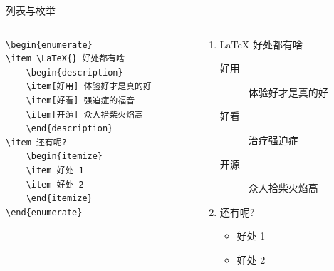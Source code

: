 \begin{frame}[fragile]{列表与枚举}
    \begin{columns}
        \begin{column}{.6\textwidth}
            \begin{lstlisting}[basicstyle=\ttfamily\small]
\begin{enumerate}
\item \LaTeX{} 好处都有啥
    \begin{description}
    \item[好用] 体验好才是真的好
    \item[好看] 强迫症的福音
    \item[开源] 众人拾柴火焰高
    \end{description}
\item 还有呢?
    \begin{itemize}
    \item 好处 1
    \item 好处 2
    \end{itemize}
\end{enumerate}\end{lstlisting}
        \end{column}
        \begin{column}{.4\textwidth}
            {\small
                \begin{enumerate}
                    \item \LaTeX{} 好处都有啥
                          \begin{description}
                              \item[好用] 体验好才是真的好
                              \item[好看] 治疗强迫症
                              \item[开源] 众人拾柴火焰高
                          \end{description}
                    \item 还有呢?
                          \begin{itemize}
                              \item 好处 1
                              \item 好处 2
                          \end{itemize}
                \end{enumerate}
            }
        \end{column}
    \end{columns}

\end{frame}



